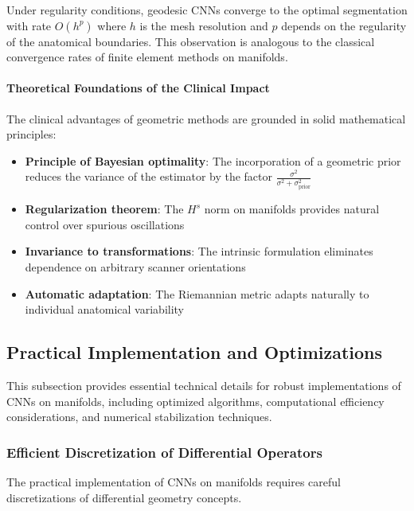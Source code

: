 \begin{remark}
Under regularity conditions, geodesic CNNs converge to the optimal segmentation with rate $O(h^{p})$ where $h$ is the mesh resolution and $p$ depends on the regularity of the anatomical boundaries. This observation is analogous to the classical convergence rates of finite element methods on manifolds.
\end{remark}

\paragraph{Theoretical Foundations of the Clinical Impact}

The clinical advantages of geometric methods are grounded in solid mathematical principles:
\begin{itemize}
    \item \textbf{Principle of Bayesian optimality}: The incorporation of a geometric prior reduces the variance of the estimator by the factor $\frac{\sigma^2}{\sigma^2 + \sigma_{\text{prior}}^2}$
    \item \textbf{Regularization theorem}: The $H^s$ norm on manifolds provides natural control over spurious oscillations
    \item \textbf{Invariance to transformations}: The intrinsic formulation eliminates dependence on arbitrary scanner orientations
    \item \textbf{Automatic adaptation}: The Riemannian metric adapts naturally to individual anatomical variability
\end{itemize}

\subsection{Practical Implementation and Optimizations}\label{subsec:implementacion_practica_variedades}

This subsection provides essential technical details for robust implementations of CNNs on manifolds, including optimized algorithms, computational efficiency considerations, and numerical stabilization techniques.

\subsubsection{Efficient Discretization of Differential Operators}\label{subsubsec:discretizacion_operadores}

The practical implementation of CNNs on manifolds requires careful discretizations of differential geometry concepts.

